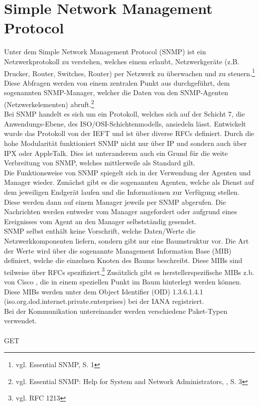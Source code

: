 \section{Simple Network Management Protocol}
\label{sec:snmp}
Unter dem Simple Network Management Protocol (SNMP) ist ein Netzwerkprotokoll zu verstehen, welches einem erlaubt, Netzwerkgeräte (z.B. Drucker, Router, Switches, Router) per Netzwerk zu überwachen und zu steuern.\footnote{vgl. Essential SNMP, S. 1}
Diese Abfragen werden von einem zentralen Punkt aus durchgeführt, dem sogenannten SNMP-Manager, welcher die Daten von den SNMP-Agenten (Netzwerkelementen) abruft.\footnote{vgl. Essential SNMP: Help for System and Network Administrators, , S. 3}\\
Bei SNMP handelt es sich um ein Protokoll, welches sich auf der Schicht 7, die Anwendungs-Ebene, des ISO/OSI-Schichtenmodells, ansiedeln lässt.
Entwickelt wurde das Protokoll von der IEFT und ist über diverse RFCs definiert.
Durch die hohe Modularität funktioniert SNMP nicht nur über IP und sondern auch über IPX oder AppleTalk.
Dies ist unteranderem auch ein Grund für die weite Verbreitung von SNMP, welches mittlerweile als Standard gilt.\\
Die Funktionsweise von  SNMP spiegelt sich in der Verwendung der Agenten und Manager wieder.
Zunächst gibt es die sogenannten Agenten, welche als Dienst auf dem jeweiligen Endgerät laufen und die Informationen zur Verfügung stellen.
Diese werden dann auf einem Manager jeweils per SNMP abgerufen.
Die Nachrichten werden entweder vom Manager angefordert oder aufgrund eines Ereignisses vom Agent an den Manager selbstständig gesendet.\\
SNMP selbst enthält keine Vorschrift, welche Daten/Werte die Netzwerkkomponenten liefern, sondern gibt nur eine Baumstruktur vor.
Die Art der Werte wird über die sogenannte Management Information Base (MIB) definiert, welche die einzelnen Knoten des Baums beschreibt.
Diese MIBs sind teilweise über RFCs spezifiziert.\footnote{vgl. RFC 1213}
Zusätzlich gibt es herstellerspezifische MIBs z.b. von Cisco , die in einem speziellen Punkt im Baum hinterlegt werden können. Diese MIBs werden unter dem  Object Identifier (OID) 1.3.6.1.4.1 (iso.org.dod.internet.private.enterprises) bei der IANA registriert.\\
Bei der Kommunikation untereinander werden verschiedene Paket-Typen verwendet.\\
\\
GET\\

